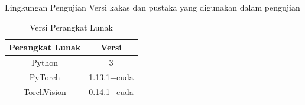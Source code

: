 \documentclass[aspectratio=169]{beamer}
\begin{document}
\begin{frame}{Lingkungan Pengujian}
  Versi kakas dan pustaka yang digunakan dalam pengujian
  \begin{table}
    \caption{Versi Perangkat Lunak}\label{softwares}
    \centering
    \begin{tabular}{ | c | c | }
      \hline
      \textbf{Perangkat Lunak} & \textbf{Versi} \\
      \hline
      Python                   & 3              \\
      \hline
      PyTorch                  & 1.13.1+cuda    \\
      \hline
      TorchVision              & 0.14.1+cuda    \\
      \hline
    \end{tabular}
  \end{table}
\end{frame}
\end{document}
